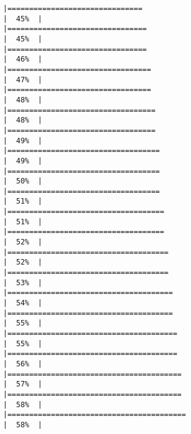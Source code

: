 \documentclass[
]{article}
\begin{document}
\begin{verbatim}
|===============================                                       |  45%  |                                                                              |================================                                      |  45%  |                                                                              |================================                                      |  46%  |                                                                              |=================================                                     |  47%  |                                                                              |=================================                                     |  48%  |                                                                              |==================================                                    |  48%  |                                                                              |==================================                                    |  49%  |                                                                              |===================================                                   |  49%  |                                                                              |===================================                                   |  50%  |                                                                              |===================================                                   |  51%  |                                                                              |====================================                                  |  51%  |                                                                              |====================================                                  |  52%  |                                                                              |=====================================                                 |  52%  |                                                                              |=====================================                                 |  53%  |                                                                              |======================================                                |  54%  |                                                                              |======================================                                |  55%  |                                                                              |=======================================                               |  55%  |                                                                              |=======================================                               |  56%  |                                                                              |========================================                              |  57%  |                                                                              |========================================                              |  58%  |                                                                              |=========================================                             |  58%  |                                                                              
\end{verbatim}
\end{document}
